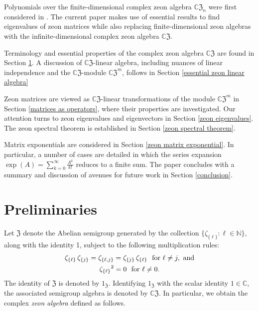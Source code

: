\documentclass{article}
\theoremstyle{definition}
\newcommand{\CZ}{\mathbb{C}\mathfrak{Z}}
\newcommand{\Z}{\mathfrak{Z}}
\numberwithin{equation}{section}
\begin{document}
Polynomials over the finite-dimensional complex zeon algebra $\CZ_n$ were first considered in \cite{simplezeonzeros}.   The current paper makes use of essential results to find eigenvalues of zeon matrices while also replacing finite-dimensional zeon algebras with the infinite-dimensional complex zeon algebra $\CZ$.  

Terminology and essential properties of the complex zeon algebra $\CZ$ are found in Section \ref{preliminaries}.   A discussion of $\CZ$-linear algebra, including nuances of linear independence and the $\CZ$-module $\CZ^m$, follows in Section \ref{essential zeon linear algebra}

Zeon matrices are viewed as $\CZ$-linear transformations of the module ${\CZ}^m$ in Section \ref{matrices as operators}, where their properties are investigated.  Our attention turns to zeon eigenvalues and eigenvectors in Section \ref{zeon eigenvalues}.  The zeon spectral theorem is established in Section \ref{zeon spectral theorem}.  

Matrix exponentials are considered in Section \ref{zeon matrix exponential}.  In particular, a number of cases are detailed in which the  series expansion $\exp(A)=\displaystyle\sum_{k=0}^\infty \frac{A^k}{k!}$ reduces to a finite sum.  The paper concludes with a summary and discussion of avenues for future work in Section \ref{conclusion}.


\section{Preliminaries}\label{preliminaries}

Let $\Z$ denote the Abelian semigroup generated by the collection $\{\zeta_{\{\ell\}}: \ell\in\mathbb{N}\}$, along with the identity 1, subject to the following multiplication rules:
\begin{gather*}
\zeta_{\{\ell\}}\,\zeta_{\{j\}}=\zeta_{\{\ell,j\}}=\zeta_{\{j\}}\,\zeta_{\{\ell\}}\,\,\text{ \rm
for }\ell\ne j,\text{ \rm and}\\
{\zeta_{\{\ell\}}}^2=0\,\,\text{ \rm for }\ell\ne 0.
\end{gather*}
The identity of $\Z$ is denoted by $1_\Z$.  Identifying $1_\Z$ with the scalar identity $1\in\mathbb{C}$, the associated semigroup algebra is denoted by $\CZ$.  In particular, we obtain the complex {\em zeon algebra} defined as follows.
\end{document}
